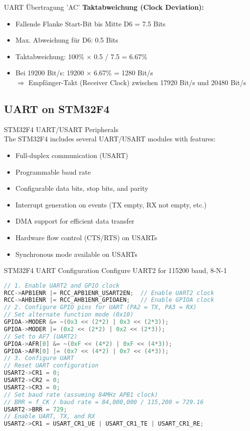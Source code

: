 \begin{example2}{UART Übertragung 'AC'}
    \textbf{Taktabweichung (Clock Deviation):}
    \begin{itemize}
        \item Fallende Flanke Start-Bit bis Mitte D6 = 7.5 Bits
        \item Max. Abweichung für D6: 0.5 Bits
        \item Taktabweichung: 100\% $\times$ 0.5 / 7.5 = 6.67\%
        \item Bei 19200 Bit/s: 19200 $\times$ 6.67\% = 1280 Bit/s \\ $\Rightarrow$ Empfänger-Takt (Receiver Clock) zwischen 17920 Bit/s und 20480 Bit/s
    \end{itemize}
\end{example2}

\subsection{UART on STM32F4}

\begin{concept}{STM32F4 UART/USART Peripherals}\\
The STM32F4 includes several UART/USART modules with features:
\begin{itemize}
    \item Full-duplex communication (USART)
    \item Programmable baud rate
    \item Configurable data bits, stop bits, and parity
    \item Interrupt generation on events (TX empty, RX not empty, etc.)
    \item DMA support for efficient data transfer
    \item Hardware flow control (CTS/RTS) on USARTs
    \item Synchronous mode available on USARTs
\end{itemize}
\end{concept}

\begin{code}{STM32F4 UART Configuration} Configure UART2 for 115200 baud, 8-N-1
\begin{lstlisting}[language=C, style=basesmol]
// 1. Enable UART2 and GPIO clock
RCC->APB1ENR |= RCC_APB1ENR_USART2EN;  // Enable UART2 clock
RCC->AHB1ENR |= RCC_AHB1ENR_GPIOAEN;   // Enable GPIOA clock
// 2. Configure GPIO pins for UART (PA2 = TX, PA3 = RX)
// Set alternate function mode (0x10)
GPIOA->MODER &= ~(0x3 << (2*2) | 0x3 << (2*3));
GPIOA->MODER |= (0x2 << (2*2) | 0x2 << (2*3));
// Set to AF7 (UART2)
GPIOA->AFR[0] &= ~(0xF << (4*2) | 0xF << (4*3));
GPIOA->AFR[0] |= (0x7 << (4*2) | 0x7 << (4*3));
// 3. Configure UART
// Reset UART configuration
USART2->CR1 = 0;
USART2->CR2 = 0;
USART2->CR3 = 0;
// Set baud rate (assuming 84MHz APB1 clock)
// BRR = f_CK / baud rate = 84,000,000 / 115,200 = 729.16
USART2->BRR = 729;
// Enable UART, TX, and RX
USART2->CR1 = USART_CR1_UE | USART_CR1_TE | USART_CR1_RE;
\end{lstlisting}
\end{code}

